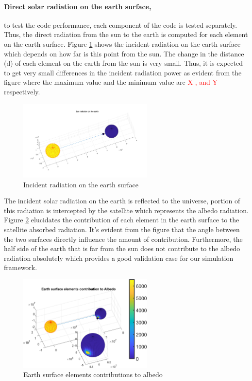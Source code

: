 \documentclass[11pt]{article}
\begin{document}
\paragraph{Direct solar radiation on the earth surface,} to test the code performance, each component of the code is tested separately. Thus, the direct radiation from the sun to the earth is computed for each element on the earth surface. Figure \ref{fig:solar-rad-on-earth} shows the incident radiation on the earth surface which depends on how far is this point from the sun. The change in the distance (d) of each element on the earth from the sun is very small. Thus, it is expected to get very small differences in the incident radiation power as evident from the figure where the maximum value and the minimum value are\textcolor{red}{ X , and Y} respectively. 

\begin{figure}[h]
    \centering
    \includegraphics[width = 0.6\textwidth]{Matlab/Sensitivity/fig_0_180.png}
    \caption{Incident radiation on the earth surface}
    \label{fig:solar-rad-on-earth}
\end{figure}


The incident solar radiation on the earth is reflected to the universe, portion of this radiation is intercepted by the satellite which represents the albedo radiation. Figure \ref{fig:albedo} elucidates the contribution of each element in the earth surface to the satellite absorbed radiation. It's evident from the figure that the angle between the two surfaces directly influence the amount of contribution. Furthermore, the half side of the earth that is far from the sun does not contribute to the albedo radiation absolutely which provides a good validation case for our simulation framework. 

\begin{figure}[h]
    \centering
    \includegraphics[width = 0.6\textwidth]{Matlab/images/albedo_elements.png}
    \caption{Earth surface elements contributions to albedo}
    \label{fig:albedo}
\end{figure}
\end{document}
